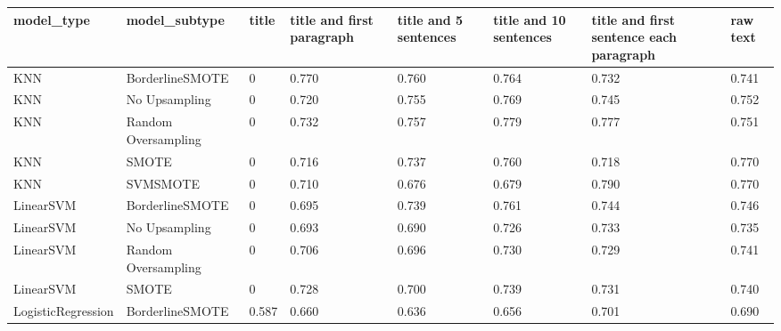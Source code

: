 \begin{tabular}{llllllll}
\toprule
                  model\_type &       model\_subtype & title & title and first paragraph & title and 5 sentences & title and 10 sentences & title and first sentence each paragraph & raw text \\
\midrule
                         KNN &     BorderlineSMOTE &     0 &                     0.770 &                 0.760 &                  0.764 &                                   0.732 &    0.741 \\
                         KNN &       No Upsampling &     0 &                     0.720 &                 0.755 &                  0.769 &                                   0.745 &    0.752 \\
                         KNN & Random Oversampling &     0 &                     0.732 &                 0.757 &                  0.779 &                                   0.777 &    0.751 \\
                         KNN &               SMOTE &     0 &                     0.716 &                 0.737 &                  0.760 &                                   0.718 &    0.770 \\
                         KNN &            SVMSMOTE &     0 &                     0.710 &                 0.676 &                  0.679 &                                   0.790 &    0.770 \\
                   LinearSVM &     BorderlineSMOTE &     0 &                     0.695 &                 0.739 &                  0.761 &                                   0.744 &    0.746 \\
                   LinearSVM &       No Upsampling &     0 &                     0.693 &                 0.690 &                  0.726 &                                   0.733 &    0.735 \\
                   LinearSVM & Random Oversampling &     0 &                     0.706 &                 0.696 &                  0.730 &                                   0.729 &    0.741 \\
                   LinearSVM &               SMOTE &     0 &                     0.728 &                 0.700 &                  0.739 &                                   0.731 &    0.740 \\
          LogisticRegression &     BorderlineSMOTE & 0.587 &                     0.660 &                 0.636 &                  0.656 &                                   0.701 &    0.690 \\

\end{tabular}
